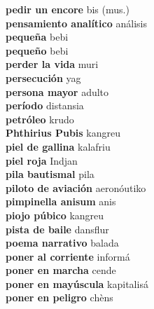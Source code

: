 \textbf{ pedir un encore  } bis (mus.) \\
\textbf{ pensamiento analítico  } análisis \\
\textbf{ pequeña  } bebi \\
\textbf{ pequeño  } bebi \\
\textbf{ perder la vida  } muri \\
\textbf{ persecución  } yag \\
\textbf{ persona mayor  } adulto \\
\textbf{ período  } distansia \\
\textbf{ petróleo  } krudo \\
\textbf{ Phthirius Pubis  } kangreu \\
\textbf{ piel de gallina  } kalafriu \\
\textbf{ piel roja  } Indjan \\
\textbf{ pila bautismal  } pila \\
\textbf{ piloto de aviación  } aeronóutiko \\
\textbf{ pimpinella anisum  } anis \\
\textbf{ piojo púbico  } kangreu \\
\textbf{ pista de baile  } dansflur \\
\textbf{ poema narrativo  } balada \\
\textbf{ poner al corriente  } informá \\
\textbf{ poner en marcha  } cende \\
\textbf{ poner en mayúscula  } kapitalisá \\
\textbf{ poner en peligro  } chèns \\
